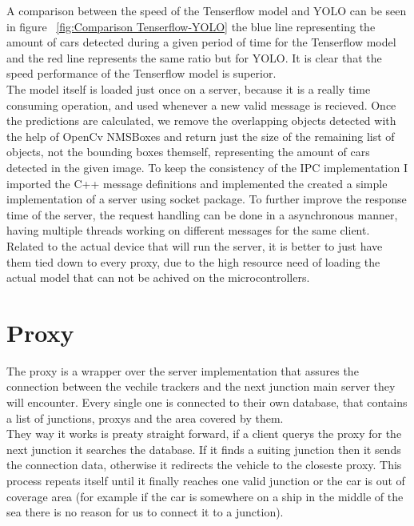 \documentclass[17pt]{report}
\begin{document}
A comparison between the speed of the Tenserflow model and YOLO can 
be seen in figure ~\ref{fig:Comparison Tenserflow-YOLO} the blue line
representing the amount of cars detected during a given period of time
for the Tenserflow model and the red line represents the same ratio
but for YOLO. It is clear that the speed performance of the
Tenserflow model is superior.\\
\indent
The model itself is loaded just once on a server, because it is a really
time consuming operation, and used whenever a new valid message is recieved.
Once the predictions are calculated, we remove the overlapping objects
detected with the help of OpenCv NMSBoxes and return just the size 
of the remaining list of objects, not the bounding boxes themself, representing 
the amount of cars detected in the given image. To keep the consistency of the IPC
implementation I imported the C++ message definitions and implemented the created
a simple implementation of a server using socket package. To further improve
the response time of the server, the request handling can be done in a asynchronous
manner, having multiple threads working on different messages for the same client. \\
\indent
Related to the actual device that will run the server, it is better to just have 
them tied down to every proxy, due to the high resource need of loading the actual 
model that can not be achived on the microcontrollers.


\pagebreak

\section{Proxy}
\indent \indent
The proxy is a wrapper over the server implementation that assures the connection
between the vechile trackers and the next junction main server they will encounter.
Every single one is connected to their own database, that contains a list of junctions,
proxys and the area covered by them. \\
\indent \indent
They way it works is preaty straight forward, if a client 
querys the proxy for the next junction it searches the database. If it finds 
a suiting junction then it sends the connection data, otherwise it redirects 
the vehicle to the closeste proxy. This process repeats itself until it 
finally reaches one valid junction or the car is out of coverage area (for 
example if the car is somewhere on a ship in the middle of the sea there is 
no reason for us to connect it to a junction).
\end{document}
